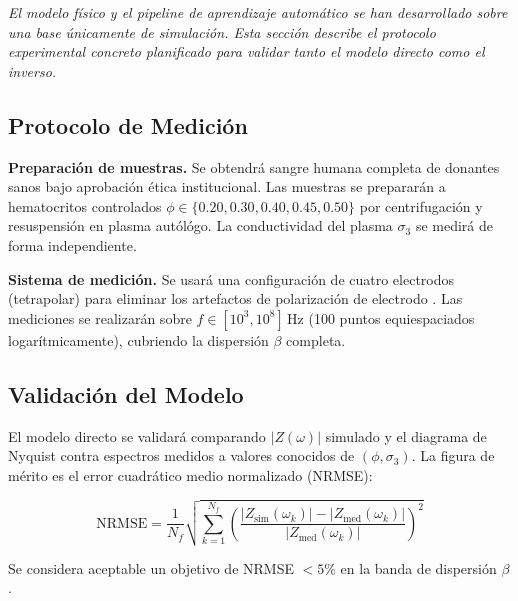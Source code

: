 \documentclass[12pt]{article}
\begin{document}
\label{sec:validacion}


\noindent\textit{El modelo f\'isico y el pipeline de aprendizaje autom\'atico se han desarrollado
sobre una base \'unicamente de simulaci\'on. Esta secci\'on describe el protocolo experimental
concreto planificado para validar tanto el modelo directo como el inverso.}

\subsection{Protocolo de Medici\'on}

\textbf{Preparaci\'on de muestras.} Se obtendr\'a sangre humana completa de donantes sanos
bajo aprobaci\'on \'etica institucional. Las muestras se preparar\'an a hematocritos controlados
$\phi \in \{0.20, 0.30, 0.40, 0.45, 0.50\}$ por centrifugaci\'on y resuspensi\'on en plasma
autól\'ogo. La conductividad del plasma $\sigma_3$ se medir\'a de forma independiente.

\textbf{Sistema de medici\'on.} Se usar\'a una configuraci\'on de cuatro electrodos (tetrapolar)
para eliminar los artefactos de polarizaci\'on de electrodo \citep{Sanchez2013}. Las
mediciones se realizar\'an sobre $f \in [10^3, 10^8]\,\text{Hz}$ (100 puntos equiespaciados
logar\'itmicamente), cubriendo la dispersi\'on $\beta$ completa.

\subsection{Validaci\'on del Modelo}

El modelo directo se validar\'a comparando $|Z(\omega)|$ simulado y el diagrama de Nyquist
contra espectros medidos a valores conocidos de $(\phi, \sigma_3)$. La figura de m\'erito es
el error cuadr\'atico medio normalizado (NRMSE):

\begin{equation}
\text{NRMSE} = \frac{1}{N_f}\sqrt{\sum_{k=1}^{N_f}
\left(\frac{|Z_{\text{sim}}(\omega_k)| - |Z_{\text{med}}(\omega_k)|}
{|Z_{\text{med}}(\omega_k)|}\right)^2}
\end{equation}

Se considera aceptable un objetivo de NRMSE $< 5\%$ en la banda de dispersi\'on $\beta$.
\end{document}
